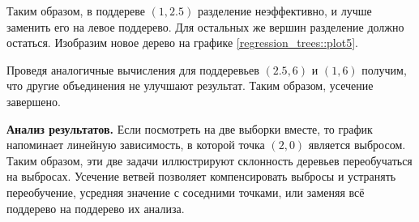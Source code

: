     Таким образом, в поддереве $(1, 2.5)$ разделение неэффективно, и лучше заменить его на левое поддерево. Для остальных же вершин разделение должно остаться. Изобразим новое дерево на графике \ref{regression_trees::plot5}.
    
    \begin{center}
    \end{center}    

    Проведя аналогичные вычисления для поддеревьев $(2.5, 6)$ и $(1, 6)$ получим, что другие объединения не улучшают результат. Таким образом, усечение завершено.

    \textbf{Анализ результатов.} Если посмотреть на две выборки вместе, то график напоминает линейную зависимость, в которой точка $(2, 0)$ является выбросом. Таким образом, эти две задачи иллюстрируют склонность деревьев переобучаться на выбросах. Усечение ветвей позволяет компенсировать выбросы и устранять переобучение, усредняя значение с соседними точками, или заменяя всё поддерево на поддерево их анализа. 


